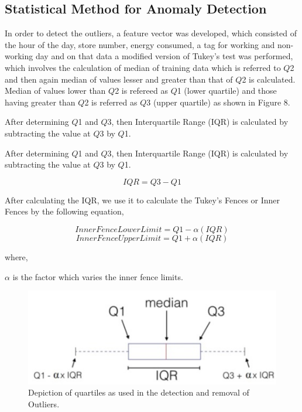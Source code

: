 \documentclass[conference]{IEEEtran}
\begin{document}
\subsection{\label{sec:level2}	Statistical Method for Anomaly Detection}
In order to detect the outliers, a feature vector was developed, which consisted of the hour of the day, store number, energy consumed, a tag for working and non-working day and on that data a modified version of Tukey's test \cite{bb31} was performed, which involves the calculation of median of training data which is referred to $\mathit{Q}$2 and then again median of values lesser and greater than that of $\mathit{Q}$2  is calculated. Median of values lower than $\mathit{Q}$2  is refereed as $\mathit{Q}$1  (lower quartile) and those having greater than $\mathit{Q}$2 is referred as $\mathit{Q}$3  (upper quartile) as shown in Figure 8. 

After determining $\mathit{Q}$1 and $\mathit{Q}$3, then Interquartile Range (IQR) is calculated by subtracting the value at $\mathit{Q}$3 by $\mathit{Q}$1.


After determining $\mathit{Q}$1 and $\mathit{Q}$3, then Interquartile Range (IQR) is calculated by subtracting the value at $\mathit{Q}$3 by $\mathit{Q}$1.

\begin{equation}
IQR = Q3 - Q1
\end{equation}

After calculating the IQR, we use it to calculate the Tukey's Fences or Inner Fences by the following equation,

\begin{equation}
InnerFenceLowerLimit = Q1 - \alpha (IQR)
\end{equation}
\begin{equation}
InnerFenceUpperLimit = Q1 + \alpha (IQR)
\end{equation}

where,

$\mathit{\alpha}$ is the factor which varies the inner fence limits.

\begin{figure}[t]
	\includegraphics[width=\linewidth]{IQR.jpg}
	\caption{Depiction of quartiles as used in the detection and removal of
		Outliers.}
	\label{fig:boat0}
\end{figure}
\end{document}

